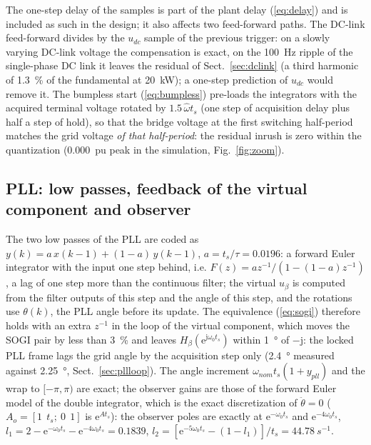 \documentclass[10pt,a4paper]{scrartcl}
\newcommand{\ts}{t_s}
\newcommand{\wo}{\omega_0}
\newcommand{\jj}{\mathrm{j}}
\newcommand{\ee}{\mathrm{e}}
\begin{document}
\begin{onehalfspace}
The one-step delay of the samples is part of the plant delay (\ref{eq:delay}) and is included as such in the design; it also affects two feed-forward paths. The DC-link feed-forward divides by the $u_{dc}$ sample of the previous trigger: on a slowly varying DC-link voltage the compensation is exact, on the \SI{100}{Hz} ripple of the single-phase DC link it leaves the residual of Sect.~\ref{sec:dclink} (a third harmonic of \SI{1.3}{\percent} of the fundamental at \SI{20}{kW}); a one-step prediction of $u_{dc}$ would remove it. The bumpless start (\ref{eq:bumpless}) pre-loads the integrators with the acquired terminal voltage rotated by $1.5\,\hat\omega\ts$ (one step of acquisition delay plus half a step of hold), so that the bridge voltage at the first switching half-period matches the grid voltage \emph{of that half-period}: the residual inrush is zero within the quantization (\SI{0.000}{pu} peak in the simulation, Fig.~\ref{fig:zoom}).

\subsection{PLL: low passes, feedback of the virtual component and observer}
\label{sec:disc_pll}

The two low passes of the PLL are coded as $y(k) = a\,x(k-1) + (1 - a)\,y(k-1)$, $a = \ts/\tau = 0.0196$: a forward Euler integrator with the input one step behind, i.e. $F(z) = a z^{-1}/(1 - (1 - a)z^{-1})$, a lag of one step more than the continuous filter; the virtual $u_\beta$ is computed from the filter outputs of this step and the angle of this step, and the rotations use $\theta(k)$, the PLL angle before its update. The equivalence (\ref{eq:sogi}) therefore holds with an extra $z^{-1}$ in the loop of the virtual component, which moves the SOGI pair by less than \SI{3}{\percent} and leaves $H_\beta(\ee^{\jj\wo\ts})$ within \SI{1}{\degree} of $-\jj$: the locked PLL frame lags the grid angle by the acquisition step only (\SI{2.4}{\degree} measured against \SI{2.25}{\degree}, Sect.~\ref{sec:pllloop}). The angle increment $\omega_{nom}\ts(1 + y_{pll})$ and the wrap to $[-\pi, \pi)$ are exact; the observer gains are those of the forward Euler model of the double integrator, which is the exact discretization of $\ddot\theta = 0$ ($A_o = [1\ \ \ts;\ 0\ \ 1]$ is $\ee^{A\ts}$): the observer poles are exactly at $\ee^{-\wo\ts}$ and $\ee^{-4\wo\ts}$, $l_1 = 2 - \ee^{-\wo\ts} - \ee^{-4\wo\ts} = 0.1839$, $l_2 = [\ee^{-5\wo\ts} - (1 - l_1)]/\ts = \SI{44.78}{s^{-1}}$.


\end{onehalfspace}
\end{document}
